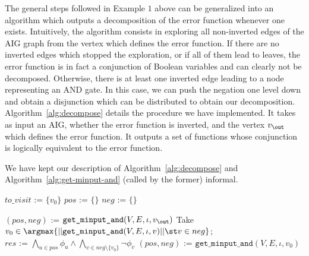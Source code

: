\documentclass[submission,copyright,creativecommons]{eptcs}
\begin{document}
The general steps followed in Example $1$ above can be generalized into an
algorithm which outputs a decomposition of the error function whenever one
exists. Intuitively, the algorithm consists in exploring all non-inverted edges
of the AIG graph from the vertex which defines the error function. If there are
no inverted edges which stopped the exploration, or if all of them lead to
leaves, the error function is in fact a conjunction of Boolean variables and can
clearly not be decomposed. Otherwise, there is at least one inverted edge
leading to a node representing an AND gate.  In this case, we can push the
negation one level down and obtain a disjunction which can be distributed to
obtain our decomposition. Algorithm~\ref{alg:decompose} details the procedure we
have implemented. It takes as input an AIG, whether the error function is
inverted, and the vertex $v_\out$ which defines the error function. It outputs a
set of functions whose conjunction is logically equivalent to the error
function.

We have kept our description of Algorithm~\ref{alg:decompose} and
Algorithm~\ref{alg:get-minput-and} (called by the former) informal.


\begin{algorithm}
	\small
	$to\_visit$ := $\{v_0\}$\;
	$pos$ := $\{\}$\;
	$neg$ := $\{\}$\;
\caption{$\texttt{get\_minput\_and}(V,E,\iota,v_0)$}
\label{alg:get-minput-and}
\end{algorithm}

\begin{algorithm}
	\small
	$(pos, neg)$ := $\texttt{get\_minput\_and}(V,E,\iota,v_\out)$\;
	{
	}
	{
	}
Take $v_0 \in \argmax\{||\texttt{get\_minput\_and}(V,E,\iota,v)|| \st
v \in neg\}$; \\
	$res$ := $\bigwedge_{u \in pos} \phi_u \land \bigwedge_{v \in neg
		\setminus \{v_0\}} \lnot \phi_v$\;
	$(pos, neg)$ := $\texttt{get\_minput\_and}(V,E,\iota,v_0)$\;
\caption{$\decompose(V,E,\iota,inv, v_\out)$}
\label{alg:decompose}
\end{algorithm}
\end{document}
